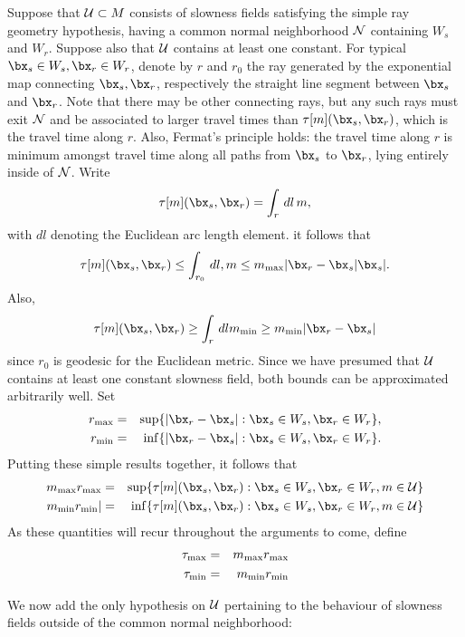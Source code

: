 Suppose that ${\cal U} \subset M$ consists of slowness fields
satisfying the simple ray geometry hypothesis, having a common normal
neighborhood ${\cal N}$ containing $W_s$ and $W_r$. Suppose also that
${\cal U}$ contains at least one constant.
For typical $\bx_s \in W_s, \bx_r \in W_r$, denote by $r$ and $r_0$
the ray generated by the exponential map connecting $\bx_s,\bx_r$, respectively
the straight line segment between $\bx_s$ and $\bx_r$. Note that there
may be other connecting rays, but any such rays must exit ${\cal N}$ and be associated to larger
travel times than $\tau[m](\bx_s,\bx_r)$, which is the travel time
along $r$. Also, Fermat's principle holds: the travel time along $r$
is minimum amongst travel time along all paths from $\bx_s$ to
$\bx_r$, lying entirely inside of ${\cal N}$. Write
\[
\tau[m](\bx_s,\bx_r) = \int_r \,dl\, m,
\]
with $dl$ denoting the Euclidean arc length element. it follows that
\[
\tau[m](\bx_s,\bx_r) \le \int_{r_0} \,dl, m \le m_{\rm max}|\bx_r -\bx_s|
\bx_s|.
\]
Also, 
\[
\tau[m](\bx_s,\bx_r) \ge \int_r \,dl m_{\rm min} \ge m_{\rm min}
|\bx_r-\bx_s|
\]
since $r_0$ is geodesic for the Euclidean metric. Since we have
presumed that ${\cal U}$ contains at least one constant slowness
field, both bounds can be approximated arbitrarily well.
Set
\begin{eqnarray}
\label{eqn:rdef}
r_{\rm max} &=& \sup \{|\bx_r-\bx_s|: \bx_s \in W_s, \bx_r \in
                W_r\},\nonumber\\
r_{\rm min} &=& \inf \{|\bx_r-\bx_s|: \bx_s \in W_s, \bx_r \in W_r\}.
\end{eqnarray}
Putting these simple results together, it follows that
\begin{eqnarray}
\label{eqn:tauglob}
m_{\rm max}r_{\rm max} & = & \sup \{\tau[m](\bx_s,\bx_r): \bx_s \in W_s, \bx_r \in 
  W_r, m \in {\cal U}\} \nonumber\\
m_{\rm min}r_{\rm min} |& = & \inf \{\tau[m](\bx_s,\bx_r): \bx_s \in W_s, \bx_r \in 
  W_r, m \in {\cal U}\}
\end{eqnarray}
As these quantities will recur throughout the arguments to come,
define
\begin{eqnarray}
\label{eqn:tauextr}
\tau_{\rm max}& = & m_{\rm max}r_{\rm max} \nonumber\\
\tau_{\rm min}& = & m_{\rm min}r_{\rm min}
\end{eqnarray}

We now add the only hypothesis on ${\cal U}$ pertaining to the
behaviour of slowness fields outside of the common normal
neighborhood:

